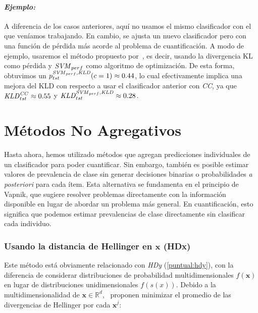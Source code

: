 \paragraph{\it Ejemplo:\/} A diferencia de los casos anteriores, aquí no usamos
el mismo clasificador con el que veníamos trabajando. En cambio, se ajusta un
nuevo clasificador pero con una función de pérdida más acorde al problema de
cuantificación. A modo de ejemplo, usaremos el método propuesto
por~\citet{esuli2010sentiment}, es decir, usando la divergencia KL como pérdida
y ${\it SVM \/}_{perf}$ como algoritmo de optimización. De esta forma, obtuvimos
un $p^{{\it SVM \/}_{perf}, {\it KLD \/}}_{tst}(c=1) \approx 0.44$, lo cual
efectivamente implica una mejora del KLD con respecto a usar el clasificador
anterior con {\it CC}, ya que ${\it KLD \/}^{\it CC\/}_{tst} \approx 0.55$ y
${\it KLD \/}^{{\it SVM \/}_{perf}, {\it KLD \/}}_{tst} \approx 0.28$.

\section{Métodos No Agregativos}\label{puntual:no_agregativos}

Hasta ahora, hemos utilizado métodos que agregan predicciones individuales de un
clasificador para poder cuantificar. Sin embargo, también es posible estimar
valores de prevalencia de clase sin generar decisiones binarias o probabilidades
{\it a posteriori\/} para cada ítem. Esta alternativa se fundamenta en el
principio de Vapnik, que sugiere resolver problemas directamente con la
información disponible en lugar de abordar un problema más general. En
cuantificación, esto significa que podemos estimar prevalencias de clase
directamente sin clasificar cada individuo.

\subsubsection{Usando la distancia de Hellinger en $\boldsymbol{x}$
(HDx)}\label{puntual:hdx}

Este método está obviamente relacionado con {\it HDy\/} (\ref{puntual:hdy}), con
la diferencia de considerar distribuciones de probabilidad multidimensionales
$f(\boldsymbol{x})$ en lugar de distribuciones unidimensionales $f(s(x))$.
Debido a la multidimensionalidad de $\boldsymbol{x} \in
\mathbb{R}^d$,~\citet{gonzalez2013class} proponen minimizar el promedio de las
divergencias de Hellinger por cada $\boldsymbol{x}^j$:

